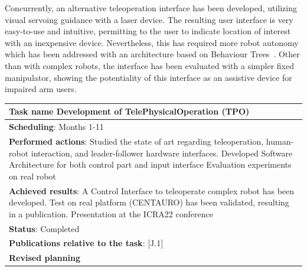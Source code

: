 Concurrently, an alternative teleoperation interface has been developed, utilizing visual servoing guidance with a laser device. The resulting user interface is very easy-to-use and intuitive, permitting to the user to indicate location of interest with an inexpensive device. Nevertheless, this has required more robot autonomy which has been addressed with an architecture based on Behaviour Trees~\cite{Iovino2022}.
Other than with complex robots, the interface has been evaluated with a simpler fixed manipulator, showing the potentiality of this interface as an assistive device for impaired arm users.
	
\begin{table}[H]
	\begin{center}
		\renewcommand{\arraystretch}{1.3} %
		\setlength{\tabcolsep}{8pt} %
		\begin{tabular}{|P{15cm}|}
			\hline
			\textbf{Task name} Development of TelePhysicalOperation (TPO) \\ \hline
			\textbf{Scheduling}: Months 1-11 \\ \hline
			\textbf{Performed actions}: Studied the state of art regarding teleoperation, human-robot interaction, and leader-follower hardware interfaces. 
			Developed Software Architecture for both control part and input interface 
			Evaluation experiments on real robot\\
			\hline
			\textbf{Achieved results}: A Control Interface to teleoperate complex robot has been developed. Test on real platform (CENTAURO) has been validated, resulting in a publication. Presentation at the ICRA22 conference \\
			\hline
			\textbf{Status}: Completed\\
			\hline
			\textbf{Publications relative to the task}: [J.1]\\
			\hline
			\textbf{Revised planning}\\
			\hline
		\end{tabular}
	\end{center}
\end{table}

